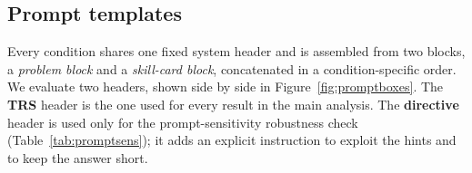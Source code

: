 
\subsection{Prompt templates}
\label{app:prompts}

Every condition shares one fixed system header and is assembled from two blocks,
a \emph{problem block} and a \emph{skill-card block}, concatenated in a
condition-specific order. We evaluate two headers, shown side by side in
Figure~\ref{fig:promptboxes}. The \textbf{TRS} header is the one used for every
result in the main analysis. The \textbf{directive} header is used only for the
prompt-sensitivity robustness check (Table~\ref{tab:promptsens}); it adds an
explicit instruction to exploit the hints and to keep the answer short.

